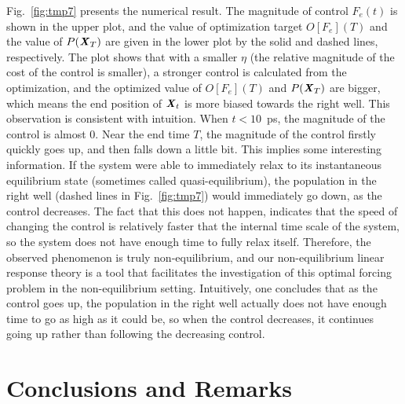 \documentclass[aip,jcp,a4paper,reprint,onecolumn]{revtex4-1}
\newcommand{\vect}[1]{\textbf{\textit{#1}}}
\begin{document}
Fig.~\ref{fig:tmp7} presents the numerical result. The magnitude of
control $F_e(t)$ is shown in the upper plot, and the value of
optimization target $O[F_e](T)$ and the value of $P(\vect X_T)$ are
given in the lower plot by the solid and dashed lines, respectively.
The plot shows that with a smaller $\eta$ (the relative magnitude of
the cost of the control is smaller), a stronger control is calculated
from the optimization, and the optimized value of $O[F_e](T)$ and
$P(\vect X_T)$ are bigger, which means the end position of $\vect X_t$
is more biased towards the right well. This observation is consistent
with intuition.  When $t<10$~ps, the magnitude of the control is
almost 0.  Near the end time $T$, the magnitude of the control firstly
quickly goes up, and then falls down a little bit.  This implies some
interesting information.  If the system were able to immediately relax
to its instantaneous equilibrium state (sometimes called
quasi-equilibrium), the population in the right well (dashed lines in
Fig.~\ref{fig:tmp7}) would immediately go down, as the control
decreases.  The fact that this does not happen, indicates that the
speed of changing the control is relatively faster that the internal
time scale of the system, so the system does not have enough time to
fully relax itself. Therefore, the observed phenomenon is truly
non-equilibrium, and our non-equilibrium linear response theory is a
tool that facilitates the investigation of this optimal forcing
problem in the non-equilibrium setting.  Intuitively, one concludes
that as the control goes up, the population in the right well actually
does not have enough time to go as high as it could be, so when the
control decreases, it continues going up rather than following the
decreasing control.




\section{Conclusions and Remarks}
\end{document}
